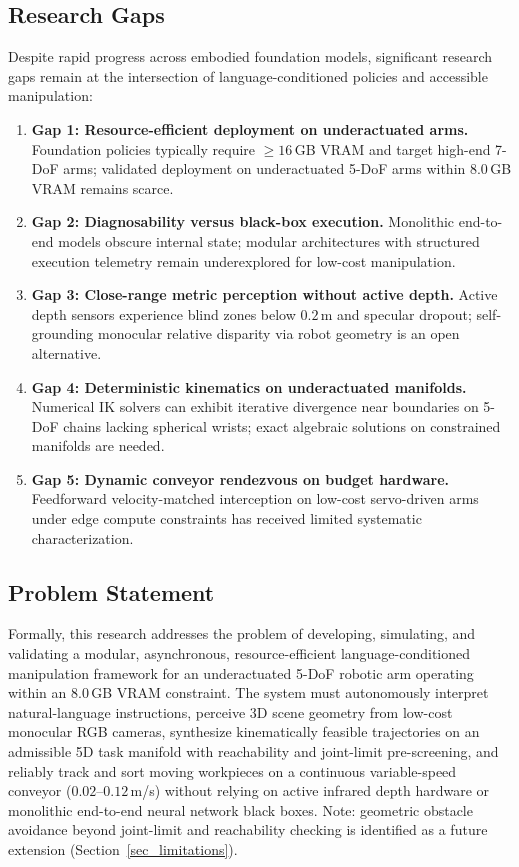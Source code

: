 \documentclass[journal]{IEEEtran}
\begin{document}
\subsection{Research Gaps}
Despite rapid progress across embodied foundation models, significant research gaps remain at the intersection of language-conditioned policies and accessible manipulation:
\begin{enumerate}
    \item \textbf{Gap 1: Resource-efficient deployment on underactuated arms.} Foundation policies typically require $\ge 16$\,GB VRAM and target high-end 7-DoF arms; validated deployment on underactuated 5-DoF arms within 8.0\,GB VRAM remains scarce.
    \item \textbf{Gap 2: Diagnosability versus black-box execution.} Monolithic end-to-end models obscure internal state; modular architectures with structured execution telemetry remain underexplored for low-cost manipulation.
    \item \textbf{Gap 3: Close-range metric perception without active depth.} Active depth sensors experience blind zones below $0.2$\,m and specular dropout; self-grounding monocular relative disparity via robot geometry is an open alternative.
    \item \textbf{Gap 4: Deterministic kinematics on underactuated manifolds.} Numerical IK solvers can exhibit iterative divergence near boundaries on 5-DoF chains lacking spherical wrists; exact algebraic solutions on constrained manifolds are needed.
    \item \textbf{Gap 5: Dynamic conveyor rendezvous on budget hardware.} Feedforward velocity-matched interception on low-cost servo-driven arms under edge compute constraints has received limited systematic characterization.
\end{enumerate}

\subsection{Problem Statement}
\label{sec_problem_statement}
Formally, this research addresses the problem of developing, simulating, and validating a modular, asynchronous, resource-efficient language-conditioned manipulation framework for an underactuated 5-DoF robotic arm operating within an 8.0\,GB VRAM constraint. The system must autonomously interpret natural-language instructions, perceive 3D scene geometry from low-cost monocular RGB cameras, synthesize kinematically feasible trajectories on an admissible 5D task manifold with reachability and joint-limit pre-screening, and reliably track and sort moving workpieces on a continuous variable-speed conveyor ($0.02\text{--}0.12$\,m/s) without relying on active infrared depth hardware or monolithic end-to-end neural network black boxes. Note: geometric obstacle avoidance beyond joint-limit and reachability checking is identified as a future extension (Section~\ref{sec_limitations}).
\end{document}

